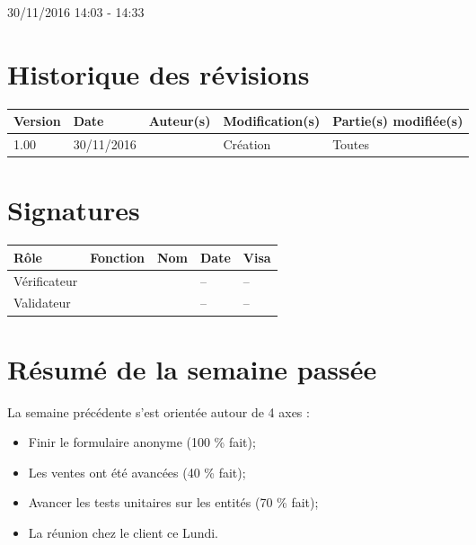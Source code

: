 \documentclass [a4paper] {article}
\begin{document}
30/11/2016			 				%
\hfill   
\hfill 	 14:03 - 14:33				%


\section*{Historique des révisions}
\begin{center}
			\begin{tabular}{| p{2.5cm} | p{3cm} | p{3cm} | p{3cm} | p{3.5cm} |}
				\hline
				\rowcolor{Gray}
				Version & Date & Auteur(s) & Modification(s) & Partie(s) modifiée(s)		 \\
				\hline
				1.00 & 30/11/2016 & \Kafui & Création & Toutes \\
				\hline			
			\end{tabular}
		\end{center}

\section*{Signatures}

		\begin{center}
			\begin{tabular}{| p{2.5cm} | p{4cm} | p{3cm} | p{3cm} | p{2.5cm} |}
				\hline
				\rowcolor{Gray}
				Rôle & Fonction & Nom & Date & Visa		 \\
				\hline
				Vérificateur & \RGC & \Melissa & -- & -- \\[30pt]
				\hline
				Validateur & \CP & \Pierre &  -- & -- \\[30pt]	
				\hline
			\end{tabular}
		\end{center}

\section{Résumé de la semaine passée}
La semaine précédente s'est orientée autour de 4 axes :  
\begin{itemize}
	\item Finir le formulaire anonyme (100 \% fait);
	\item Les ventes ont été avancées (40 \% fait);
	\item Avancer les tests unitaires sur les entités (70 \% fait);
	\item La réunion chez le client ce Lundi.
\end{itemize} 
\end{document}
